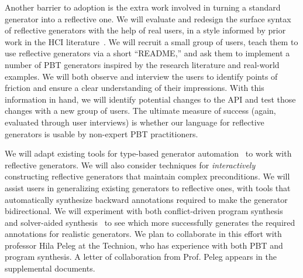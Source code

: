 Another barrier to adoption is the extra work involved in turning a standard
generator into a reflective one. 
We will evaluate and redesign the surface syntax of reflective generators with
the help of real users, in a style informed by prior work in the HCI
literature~\cite{ref:ko2015practical}.  We will recruit a small group of users, teach
them to use reflective generators via a short ``README,'' and ask
them to implement a number of PBT generators inspired by the research
literature and real-world examples. We will both observe and interview
the users to identify points of friction and ensure a clear understanding of their
impressions. With this information in hand, we will identify potential changes
to the API and test those changes with a new group of users.  The
ultimate measure of success (again, evaluated through user interviews)
is whether our language for reflective generators is usable by non-expert PBT
practitioners.


We will adapt existing tools for type-based generator
automation~\cite{mista2019deriving} to work with reflective generators.
We will also consider techniques for {\em interactively}
constructing reflective generators that maintain complex preconditions.
We will assist
users in generalizing existing generators to reflective ones, with tools that automatically synthesize backward annotations
required to make the generator bidirectional. We will experiment with both
conflict-driven program synthesis~\cite{feng_program_2018} and solver-aided
synthesis~\cite{torlak_growing_2013} to see which more successfully generates
the required annotations for realistic generators.
We plan to collaborate in this effort with professor Hila
Peleg at the Technion, who has experience with both PBT and program synthesis. A
letter of collaboration from Prof.{} Peleg appears in the supplemental documents.

